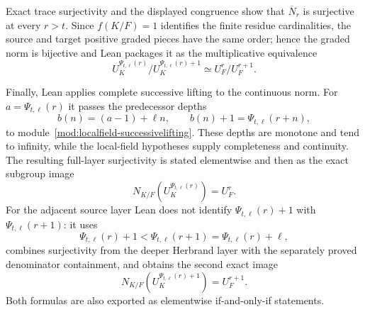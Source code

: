 \begin{theorem}
Exact trace surjectivity and the displayed congruence show that
$\overline N_r$ is surjective at every $r>t$.  Since $f(K/F)=1$ identifies
the finite residue cardinalities, the source and target positive graded
pieces have the same order; hence the graded norm is bijective and Lean
packages it as the multiplicative equivalence
\[
 U_K^{\Psi_{t,\ell}(r)}/U_K^{\Psi_{t,\ell}(r)+1}
   \simeq U_F^r/U_F^{r+1}.
\]

Finally, Lean applies complete successive lifting to the continuous norm.
For $a=\Psi_{t,\ell}(r)$ it passes the predecessor depths
\[
 b(n)=(a-1)+\ell n,
 \qquad b(n)+1=\Psi_{t,\ell}(r+n),
\]
to module~\ref{mod:localfield-successivelifting}.  These depths are
monotone and tend to infinity, while the local-field hypotheses supply
completeness and continuity.  The resulting full-layer surjectivity is
stated elementwise and then as the exact subgroup image
\[
 \boxed{N_{K/F}(U_K^{\Psi_{t,\ell}(r)})=U_F^r}.
\]
For the adjacent source layer Lean does not identify
$\Psi_{t,\ell}(r)+1$ with $\Psi_{t,\ell}(r+1)$: it uses
\[
 \Psi_{t,\ell}(r)+1<\Psi_{t,\ell}(r+1)
   =\Psi_{t,\ell}(r)+\ell,
\]
combines surjectivity from the deeper Herbrand layer with the separately
proved denominator containment, and obtains the second exact image
\[
 \boxed{N_{K/F}(U_K^{\Psi_{t,\ell}(r)+1})=U_F^{r+1}}.
\]
Both formulas are also exported as elementwise if-and-only-if statements.


\end{theorem}

